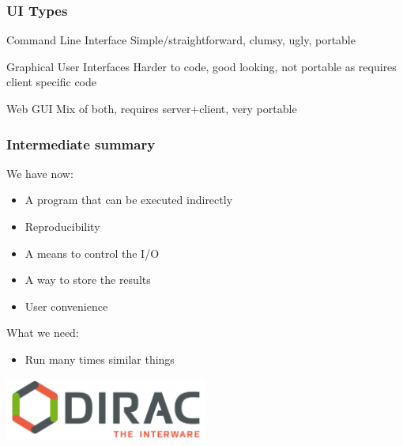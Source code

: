 \documentclass[14pt]{beamer}
\begin{document}
\begin{frame}
\frametitle{UI Types}
\begin{block}{Command Line Interface}
Simple/straightforward, clumsy, ugly, portable
\end{block}
\begin{block}{Graphical User Interfaces}
Harder to code, good looking, not portable as requires client specific code
\end{block}
\begin{block}{Web GUI}
Mix of both, requires server+client, very portable
\end{block}
\end{frame}

\begin{frame}
\frametitle{Intermediate summary}
We have now:
\begin{itemize}
\item A program that can be executed indirectly
\item Reproducibility
\item A means to control the I/O
\item A way to store the results
\item User convenience
\end{itemize}
What we need:
\begin{itemize}
\item Run many times similar things
\end{itemize}

\centering
\includegraphics[width=0.5\textwidth]{Dirac_logo_RGB.png}

\end{frame}
\end{document}
